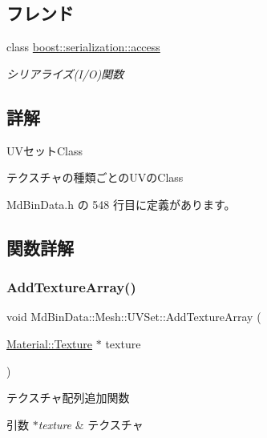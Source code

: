 \subsection*{フレンド}
\begin{DoxyCompactItemize}
\item 
class \mbox{\hyperlink{class_md_bin_data_1_1_mesh_1_1_u_v_set_ac98d07dd8f7b70e16ccb9a01abf56b9c}{boost\+::serialization\+::access}}
\begin{DoxyCompactList}\small\item\em シリアライズ(I/O)関数 \end{DoxyCompactList}\end{DoxyCompactItemize}


\subsection{詳解}
U\+Vセット\+Class 

テクスチャの種類ごとの\+U\+Vの\+Class 

 Md\+Bin\+Data.\+h の 548 行目に定義があります。



\subsection{関数詳解}
\mbox{\label{class_md_bin_data_1_1_mesh_1_1_u_v_set_a6b9333784f0a6b52dafebadd610da2cf}} 
\subsubsection{\texorpdfstring{Add\+Texture\+Array()}{AddTextureArray()}}
{\footnotesize\ttfamily void Md\+Bin\+Data\+::\+Mesh\+::\+U\+V\+Set\+::\+Add\+Texture\+Array (\begin{DoxyParamCaption}\item[{\mbox{\hyperlink{class_md_bin_data_1_1_material_1_1_texture}{Material\+::\+Texture}} $\ast$}]{texture }\end{DoxyParamCaption})}



テクスチャ配列追加関数 


\begin{DoxyParams}{引数}
{\em $\ast$texture} & テクスチャ \\
\hline
\end{DoxyParams}


